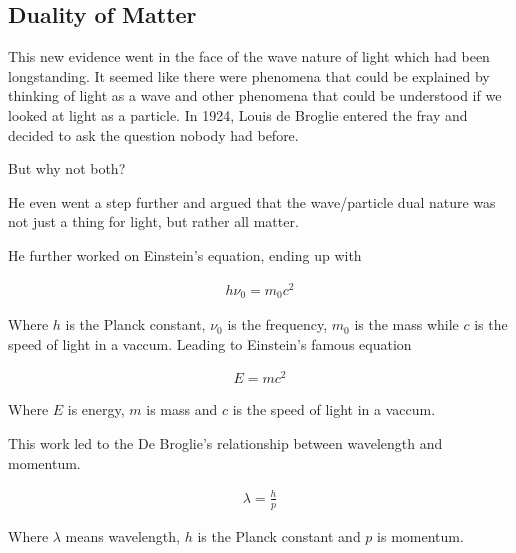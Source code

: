 \subsection{Duality of Matter}This new evidence went in the face of the wave nature of light which had been longstanding.
It seemed like  there were phenomena that could be explained by thinking of light as a wave and other phenomena that could be understood if we looked at light as a particle.
In 1924, Louis de Broglie entered the fray and decided to ask the question nobody had before.

But why not both?

He even went a step further and argued that the wave/particle dual nature was not just a thing for light, but rather all matter.

He further worked on Einstein's equation, ending up with

\begin{align}
  h \nu_0 = m_0 c^2
\end{align}

Where $h$ is the Planck constant, $\nu_0$ is the frequency, $m_0$ is the mass while $c$ is the speed of light in a vaccum. Leading to Einstein's famous equation

\begin{align}
  E = m c^2
\end{align}

Where $E$ is energy, $m$ is mass and $c$ is the speed of light in a vaccum.

This work led to the De Broglie's relationship between wavelength and momentum.

\begin{align}
  \lambda = \frac{h}{p}  
\end{align}

Where $\lambda$ means wavelength, $h$ is the Planck constant and $p$ is momentum.




